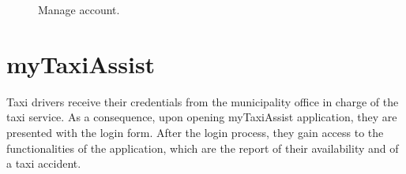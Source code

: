 \begin{figure}%
	\hfill%
	\hfill%
	\caption{Manage account.}\label{fig:manageAccount}
\end{figure}

\clearpage

\section{myTaxiAssist}
Taxi drivers receive their credentials from the municipality office in charge of the taxi service. As a consequence, upon opening myTaxiAssist application, they are presented with the login form. After the login process, they gain access to the functionalities of the application, which are the report of their availability and of a taxi accident.

